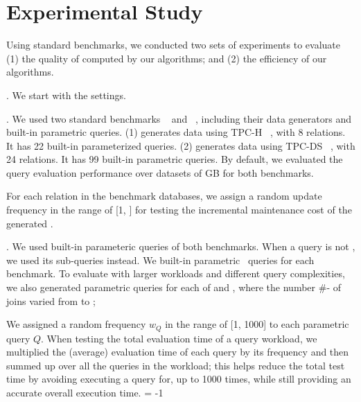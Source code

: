 \vspace{2ex}
\section{Experimental Study}
\label{sec-expt}

Using standard benchmarks, we conducted two sets of experiments to evaluate
(1) the quality of \bdss computed by our algorithms; and
(2) the efficiency of our algorithms.


. We start with the settings.

. We used two standard benchmarks
\tpch~\cite{tpch} and \tpcds~\cite{tpcds}, including their 
data generators and built-in parametric queries.
(1) \tpch generates data using {\small TPC-H}
~\cite{tpch}, with 8 relations. It has 22 built-in
parameterized \SQL queries.
(2) \tpcds generates data using {\small
TPC-DS} ~\cite{tpcds}, with 24 relations. It has 99
built-in parametric \SQL queries.
By default, we evaluated the query evaluation performance over
datasets of  GB for both benchmarks. 

For each relation in the benchmark databases, we assign a random
update frequency in the range of [1, ] for testing the
incremental maintenance cost of the generated \bdss. 


. We used built-in %
parameteric
queries of both benchmarks. When a query is not
\SPC, we used its \SPC sub-queries instead. %
We
 built-in parametric \SPC\ queries for each
benchmark. To evaluate with larger workloads and different
query complexities, we also
generated  %
 parametric queries for each of \tpch and \tpcds,
where the number \#- of joins varied from  to
;

\vspace{0.6ex}
We assigned a random frequency $w_{Q}$ in the range
of [1, 1000] to each
parametric query $Q$. When testing the total
evaluation time of a query workload, we multiplied the (average)
evaluation time of each query by its frequency and then summed up
over all the queries in the workload; this helps reduce the total
test time by avoiding executing a query for, \eg up to 1000
times, while still providing an accurate overall execution time.
\looseness = -1


